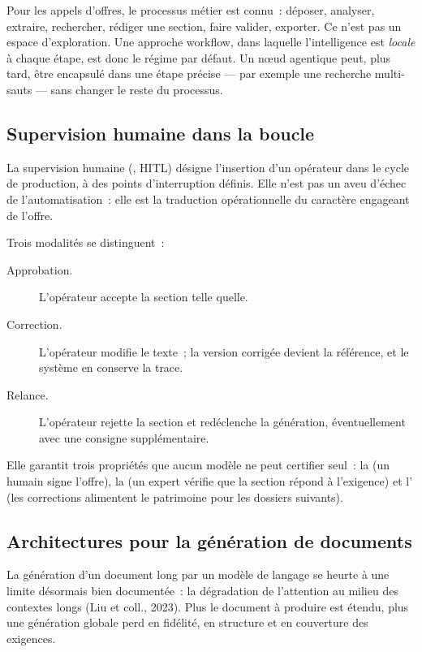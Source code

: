 Pour les appels d'offres, le processus métier est connu~: déposer, analyser,
extraire, rechercher, rédiger une section, faire valider, exporter. Ce
n'est pas un espace d'exploration. Une approche workflow, dans laquelle
l'intelligence est \emph{locale} à chaque étape, est donc le régime par
défaut. Un n\oe ud agentique peut, plus tard, être encapsulé dans une
étape précise --- par exemple une recherche multi-sauts --- sans changer le
reste du processus.

\subsection{Supervision humaine dans la boucle}

La supervision humaine (, HITL) désigne
l'insertion d'un opérateur dans le cycle de production, à des points
d'interruption définis. Elle n'est pas un aveu d'échec de l'automatisation~:
elle est la traduction opérationnelle du caractère engageant de l'offre.

Trois modalités se distinguent~:

\begin{description}
  \item[Approbation.] L'opérateur accepte la section telle quelle.
  \item[Correction.] L'opérateur modifie le texte~; la version corrigée
        devient la référence, et le système en conserve la trace.
  \item[Relance.] L'opérateur rejette la section et redéclenche la
        génération, éventuellement avec une consigne supplémentaire.
\end{description}

\begin{btpbox}
Elle garantit trois propriétés que aucun modèle ne peut certifier seul~:
la  (un humain signe l'offre), la
 (un expert vérifie que la section répond à
l'exigence) et l' (les corrections
alimentent le patrimoine pour les dossiers suivants).
\end{btpbox}

\subsection{Architectures pour la génération de documents}

La génération d'un document long par un modèle de langage se heurte à une
limite désormais bien documentée~: la dégradation de l'attention au milieu
des contextes longs (Liu et coll., 2023). Plus le document à produire est
étendu, plus une génération globale perd en fidélité, en structure et en
couverture des exigences.


